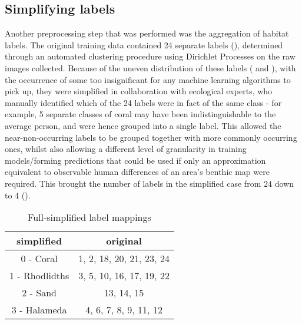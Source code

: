 
\subsection{Simplifying labels}
Another preprocessing step that was performed was the aggregation of habitat labels. The original training data contained 24 separate labels (), determined through an automated clustering procedure using Dirichlet Processes on the raw images collected. Because of the uneven distribution of these labels ( and ), with the occurrence of some too insignificant for any machine learning algorithms to pick up, they were simplified in collaboration with ecological experts, who manually identified which of the 24 labels were in fact of the same class - for example, 5 separate classes of coral may have been indistinguishable to the average person, and were hence grouped into a single label. This allowed the near-non-occurring labels to be grouped together with more commonly occurring ones, whilst also allowing a different level of granularity in training models/forming predictions that could be used if only an approximation equivalent to observable human differences of an area's benthic map were required. This brought the number of labels in the simplified case from $24$ down to $4$ (). %

\begin{table}[H]
    \centering
    \begin{tabular}{|c| c|}
        \hline
        simplified & original \\\hline
        0 - Coral  & 1, 2, 18, 20, 21, 23, 24 \\
        1 - Rhodlidths & 3, 5, 10, 16, 17, 19, 22\\
        2 - Sand & 13, 14, 15 \\
        3 - Halameda & 4, 6, 7, 8, 9, 11, 12 \\
        \hline
    \end{tabular}
    \caption{Full-simplified label mappings \tiny{}}
    \label{table:labelmappings}
\end{table}

